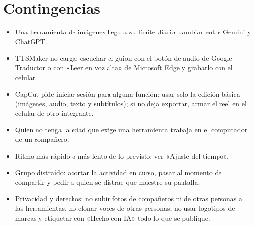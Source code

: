 \documentclass[11pt,a4paper]{article}
\begin{document}
\section{Contingencias}
\begin{itemize}
\item Una herramienta de imágenes llega a su límite diario: cambiar entre Gemini y ChatGPT.
\item TTSMaker no carga: escuchar el guion con el botón de audio de Google Traductor o con «Leer en voz alta» de Microsoft Edge y grabarlo con el celular.
\item CapCut pide iniciar sesión para alguna función: usar solo la edición básica (imágenes, audio, texto y subtítulos); si no deja exportar, armar el reel en el celular de otro integrante.
\item Quien no tenga la edad que exige una herramienta trabaja en el computador de un compañero.
\item Ritmo más rápido o más lento de lo previsto: ver «Ajuste del tiempo».
\item Grupo distraído: acortar la actividad en curso, pasar al momento de compartir y pedir a quien se distrae que muestre su pantalla.
\item Privacidad y derechos: no subir fotos de compañeros ni de otras personas a las herramientas, no clonar voces de otras personas, no usar logotipos de marcas y etiquetar con «Hecho con IA» todo lo que se publique.
\end{itemize}
\end{document}
